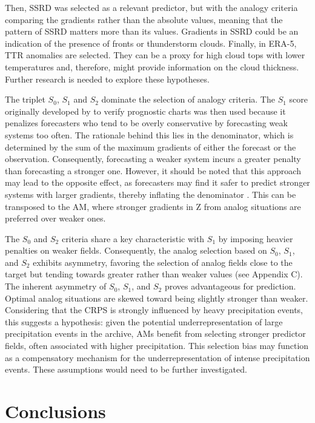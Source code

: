 \documentclass[draft]{agujournal2019}
\begin{document}
Then, SSRD was selected as a relevant predictor, but with the analogy criteria comparing the gradients rather than the absolute values, meaning that the pattern of SSRD matters more than its values. Gradients in SSRD could be an indication of the presence of fronts or thunderstorm clouds. Finally, in ERA-5, TTR anomalies are selected. They can be a proxy for high cloud tops with lower temperatures and, therefore, might provide information on the cloud thickness. Further research is needed to explore these hypotheses.

The triplet $S_{0}$, $S_{1}$ and $S_{2}$ dominate the selection of analogy criteria. The $S_{1}$ score originally developed by  to verify prognostic charts was then used because it penalizes forecasters who tend to be overly conservative by forecasting weak systems too often. The rationale behind this lies in the denominator, which is determined by the sum of the maximum gradients of either the forecast or the observation. Consequently, forecasting a weaker system incurs a greater penalty than forecasting a stronger one. However, it should be noted that this approach may lead to the opposite effect, as forecasters may find it safer to predict stronger systems with larger gradients, thereby inflating the denominator \cite{Thompson1972}. This can be transposed to the AM, where stronger gradients in Z from analog situations are preferred over weaker ones.

The $S_{0}$ and $S_{2}$ criteria share a key characteristic with $S_{1}$ by imposing heavier penalties on weaker fields. Consequently, the analog selection based on $S_{0}$, $S_{1}$, and $S_{2}$ exhibits asymmetry, favoring the selection of analog fields close to the target but tending towards greater rather than weaker values (see Appendix C). The inherent asymmetry of $S_{0}$, $S_{1}$, and $S_{2}$ proves advantageous for prediction. Optimal analog situations are skewed toward being slightly stronger than weaker. Considering that the CRPS is strongly influenced by heavy precipitation events, this suggests a hypothesis: given the potential underrepresentation of large precipitation events in the archive, AMs benefit from selecting stronger predictor fields, often associated with higher precipitation. This selection bias may function as a compensatory mechanism for the underrepresentation of intense precipitation events. These assumptions would need to be further investigated.


\section{Conclusions}
\label{conclusions}
\end{document}
